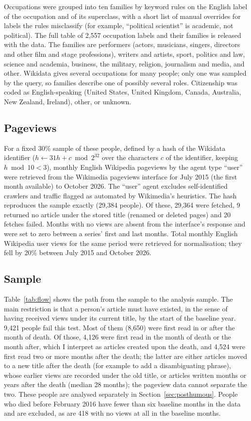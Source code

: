 \documentclass[11pt,a4paper]{article}
\begin{document}
Occupations were grouped into ten families by keyword rules on the English label of the occupation and of its superclass, with a short list of manual overrides for labels the rules misclassify (for example, ``political scientist'' is academic, not political). The full table of 2,557 occupation labels and their families is released with the data. The families are performers (actors, musicians, singers, directors and other film and stage professions), writers and artists, sport, politics and law, science and academia, business, the military, religion, journalism and media, and other. Wikidata gives several occupations for many people; only one was sampled by the query, so families describe one of possibly several roles. Citizenship was coded as English-speaking (United States, United Kingdom, Canada, Australia, New Zealand, Ireland), other, or unknown.

\subsection{Pageviews}
For a fixed 30\% sample of these people, defined by a hash of the Wikidata identifier ($h \leftarrow 31h + c \bmod 2^{32}$ over the characters $c$ of the identifier, keeping $h \bmod 10 < 3$), monthly English Wikipedia pageviews by the agent type ``user'' were retrieved from the Wikimedia pageviews interface for July 2015 (the first month available) to October 2026. The ``user'' agent excludes self-identified crawlers and traffic flagged as automated by Wikimedia's heuristics. The hash reproduces the sample exactly (29,384 people). Of these, 29,364 were fetched, 9 returned no article under the stored title (renamed or deleted pages) and 20 fetches failed. Months with no views are absent from the interface's response and were set to zero between a series' first and last months. Total monthly English Wikipedia user views for the same period were retrieved for normalisation; they fell by 20\% between July 2015 and October 2026.

\subsection{Sample}
Table~\ref{tab:flow} shows the path from the sample to the analysis sample. The main restriction is that a person's article must have existed, in the sense of having received views under its current title, by the start of the baseline year. 9,421 people fail this test. Most of them (8,650) were first read in or after the month of death. Of those, 4,126 were first read in the month of death or the month after, which I interpret as articles created upon the death, and 4,524 were first read two or more months after the death; the latter are either articles moved to a new title after the death (for example to add a disambiguating phrase), whose earlier views are recorded under the old title, or articles written months or years after the death (median 28 months); the pageview data cannot separate the two. These people are analysed separately in Section~\ref{sec:posthumous}. People who died before February 2016 have fewer than six baseline months in the data and are excluded, as are 418 with no views at all in the baseline months.
\end{document}
